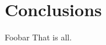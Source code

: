 \chapter{Conclusions}
\label{ch:conclusions}
\graphicspath{{./img/conclusions/}}
Foobar
That is all.
